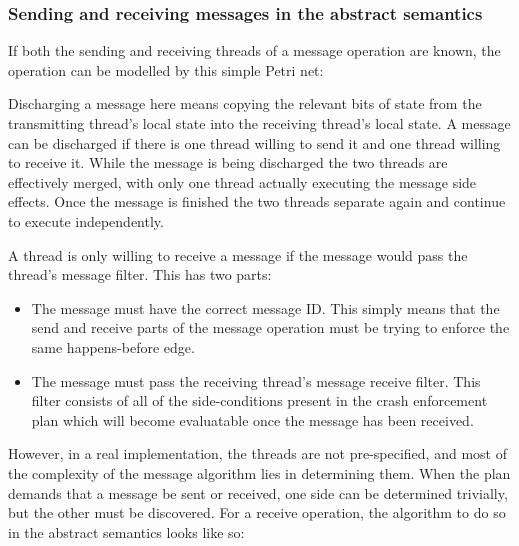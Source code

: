 \subsubsection{Sending and receiving messages in the abstract semantics}

If both the sending and receiving threads of a message operation are known, the operation can be modelled by this simple Petri net:


Discharging a message here means copying the relevant bits of state from the transmitting thread's local state into the receiving thread's local state.
A message can be discharged if there is one thread willing to send it and one thread willing to receive it.
While the message is being discharged the two threads are effectively merged, with only one thread actually executing the message side effects.
Once the message is finished the two threads separate again and continue to execute independently.

A thread is only willing to receive a message if the message would pass the thread's message filter.
This has two parts:

\begin{itemize}
\item
  The message must have the correct message ID.
  This simply means that the send and receive parts of the message operation must be trying to enforce the same happens-before edge.
\item
  The message must pass the receiving thread's message receive filter.
  This filter consists of all of the side-conditions present in the crash enforcement plan which will become evaluatable once the message has been received.
\end{itemize}

However, in a real implementation, the threads are not pre-specified, and most of the complexity of the message algorithm lies in determining them.
When the plan demands that a message be sent or received, one side can be determined trivially, but the other must be discovered.
For a receive operation, the algorithm to do so in the abstract semantics looks like so:

